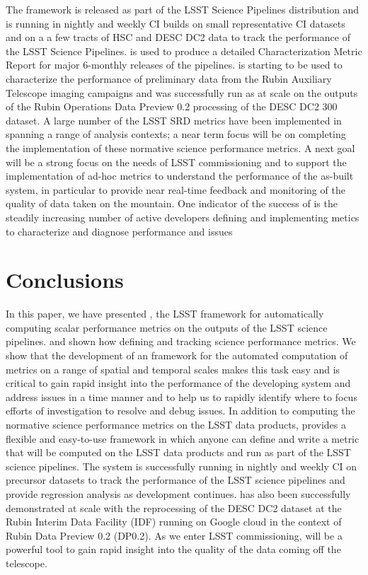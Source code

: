The \faro framework is released as part of the LSST Science Pipelines distribution and is running in 
nightly and weekly CI builds on small representative CI datasets and on a a few tracts of HSC and DESC DC2 data to track the performance of the LSST Science Pipelines. 
\faro is used to produce a detailed Characterization Metric Report for major 6-monthly releases of the pipelines. 
\faro is starting to be used to characterize the performance of preliminary data from the Rubin Auxiliary Telescope imaging campaigns and was successfully run as at scale on the outputs of the Rubin Operations Data Preview 0.2 processing of the DESC DC2 300 \degsq dataset.
A large number of the LSST SRD metrics have been implemented in \faro spanning a range of analysis contexts; a near term focus will be on completing the implementation of these normative science performance metrics. 
A next goal will be a strong focus on the needs of LSST commissioning and to support the implementation of ad-hoc metrics to understand the performance of the as-built system, in particular to provide near real-time feedback and monitoring of the quality of data taken on the mountain. 
One indicator of the success of \faro is the steadily increasing number of active developers defining and implementing metics to characterize and diagnose performance and issues 

\section{Conclusions} \label{sec:conclusions}

In this paper, we have presented \faro, the LSST framework for automatically computing scalar performance metrics on the outputs of the LSST science pipelines. 
and shown how defining and tracking science performance  metrics.
We show that the development of an framework for the automated computation of metrics on a range of spatial and temporal scales makes this task easy and is critical to gain rapid insight into the performance of the developing system and address issues in a time manner and to help us to rapidly identify where to focus efforts of investigation to resolve and debug issues. 
In addition to computing the normative science performance metrics on the LSST data products, \faro provides a flexible and easy-to-use framework in which anyone can define and write a metric that will be computed on the LSST data products and run as part of the LSST science pipelines. 
The system is successfully running in nightly and weekly CI on precursor datasets to track the performance of the LSST science pipelines and provide regression analysis as development continues. 
\faro has also been successfully demonstrated at scale with the reprocessing of the DESC DC2 dataset \cite{2021ApJS..253...31L} at the Rubin Interim Data Facility (IDF) running on Google cloud \cite{2021arXiv211115030O} in the context of Rubin Data Preview 0.2 (DP0.2)\cite{RTN-001}. 
As we enter LSST commissioning, \faro will be a powerful tool to gain rapid insight into the quality of the data coming off the telescope. 

